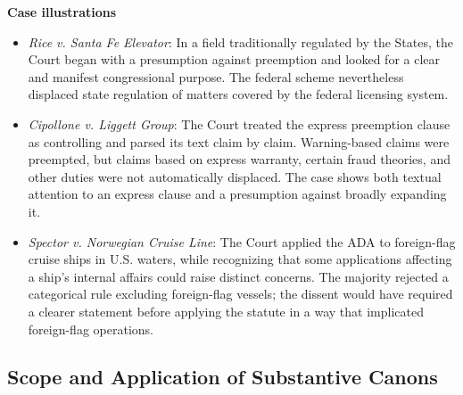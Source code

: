\documentclass[11pt]{tex/lawoutline}
\begin{document}
\textbf{Case illustrations}

\begin{itemize}
    \item \textit{Rice v. Santa Fe Elevator}: In a field traditionally regulated by the States, the Court began with a presumption against preemption and looked for a clear and manifest congressional purpose. The federal scheme nevertheless displaced state regulation of matters covered by the federal licensing system.
    \item \textit{Cipollone v. Liggett Group}: The Court treated the express preemption clause as controlling and parsed its text claim by claim. Warning-based claims were preempted, but claims based on express warranty, certain fraud theories, and other duties were not automatically displaced. The case shows both textual attention to an express clause and a presumption against broadly expanding it.
    \item \textit{Spector v. Norwegian Cruise Line}: The Court applied the ADA to foreign-flag cruise ships in U.S. waters, while recognizing that some applications affecting a ship's internal affairs could raise distinct concerns. The majority rejected a categorical rule excluding foreign-flag vessels; the dissent would have required a clearer statement before applying the statute in a way that implicated foreign-flag operations.
\end{itemize}

\subsection{Scope and Application of Substantive Canons}
\end{document}
